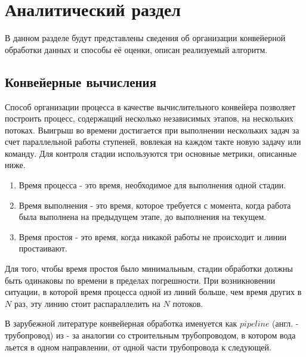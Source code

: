 \chapter{Аналитический раздел}\label{sec:analyth}
В данном разделе будут представлены сведения об организации конвейерной обработки данных и способы её оценки,  описан реализуемый алгоритм. 
\section{Конвейерные вычисления}\label{subsec:pipe}
Способ организации процесса в качестве вычислительного конвейера позволяет построить процесс, содержащий несколько независимых этапов\cite{pipeline}, на нескольких потоках. Выигрыш во времени достигается при выполнении нескольких задач за счет параллельной работы ступеней, вовлекая на каждом такте новую задачу или команду. 
Для контроля стадии используются три основные метрики, описанные ниже.
\begin{enumerate}
	\setlength{\itemsep}{1.2pt}
	\item Время процесса - это время, необходимое для выполнения одной стадии.
	\item Время выполнения - это время, которое требуется с момента, когда работа была выполнена на предыдущем этапе, до выполнения на текущем. 
	\item Время простоя - это время, когда никакой работы не происходит и линии простаивают. 
\end{enumerate}
Для того, чтобы время простоя было минимальным, стадии обработки должны быть одинаковы по времени в пределах погрешности. При возникновении ситуации, в которой время процесса одной из линий больше, чем время других в $N$ раз, эту линию стоит распараллелить на $N$ потоков. 

В зарубежной литературе\cite{pipe-eng} конвейерная обработка именуется как $pipeline$ (англ. - трубопровод) из - за аналогии со строительным трубопроводом, в котором вода льется в одном направлении, от одной части трубопровода к следующей.

